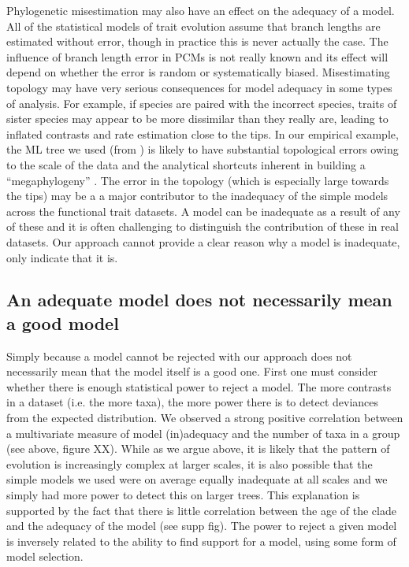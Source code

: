 \documentclass[a4paper,12pt]{article}
\begin{document}
Phylogenetic misestimation may also have an effect on the adequacy of a model. All of the statistical models of trait evolution assume that branch lengths are estimated without error, though in practice this is never actually the case. The influence of branch length error in PCMs is not really known and its effect will depend on whether the error is random or systematically biased. Misestimating topology may have very serious consequences for model adequacy in some types of analysis. For example, if species are paired with the incorrect species, traits of sister species may appear to be more dissimilar than they really are, leading to inflated contrasts and rate estimation close to the tips. In our empirical example, the ML tree we used (from \citep{Zanne2013}) is likely to have substantial topological errors owing to the scale of the data and the analytical shortcuts inherent in building a ``megaphylogeny'' \citep{Smith2009}. The error in the topology (which is especially large towards the tips) may be a a major contributor to the inadequacy of the simple models across the functional trait datasets. 
A model can be inadequate as a result of any of these and it is often challenging to distinguish the contribution of these in real datasets. Our approach cannot provide a clear reason why a model is inadequate, only indicate that it is.

\subsection*{An adequate model does not necessarily mean a good model}
Simply because a model cannot be rejected with our approach does not necessarily mean that the model itself is a good one. First one must consider whether there is enough statistical power to reject a model. The more contrasts in a dataset (i.e. the more taxa), the more power there is to detect deviances from the expected distribution. We observed a strong positive correlation between a multivariate measure of model (in)adequacy and the number of taxa in a group (see above, figure XX). While as we argue above, it is likely that the pattern of evolution is increasingly complex at larger scales, it is also possible that the simple models we used were on average equally inadequate at all scales and we simply had more power to detect this on larger trees. This explanation is supported by the fact that there is little correlation between the age of the clade and the adequacy of the model (see supp fig). The power to reject a given model is inversely related to the ability to find support for a model, using some form of model selection.
\end{document}
